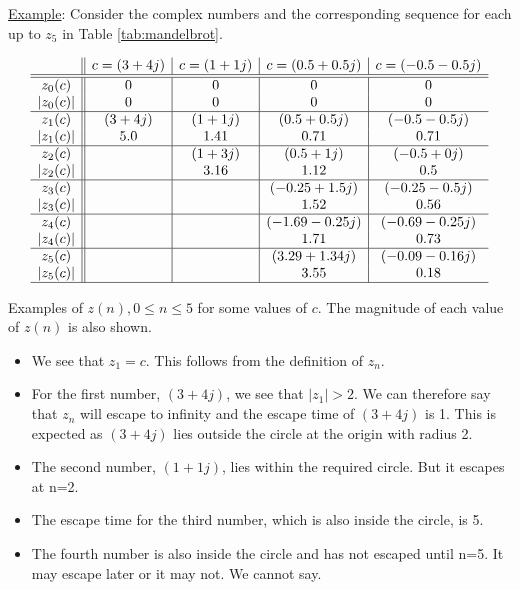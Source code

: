 \documentclass[addpoints]{exam}
\begin{document}
\begin{questions}
  \underline{Example}: Consider the complex numbers and the corresponding sequence for each up to $z_5$ in Table \ref{tab:mandelbrot}.
  \begin{table}
  \[
    \begin{array}{c|*{4}{|c}}
      & c=(3+4j) & c=(1+1j) & c=(0.5+0.5j) & c=(-0.5-0.5j)\\\hline\hline
      z_0(c) & 0 & 0 & 0 & 0\\
      |z_0(c)| & 0 & 0 & 0 & 0\\\hline
      z_1(c) & (3+4j) & (1+1j) & (0.5+0.5j) & (-0.5-0.5j)\\
      |z_1(c)| & 5.0 & 1.41 & 0.71 & 0.71\\\hline
      z_2(c) &  & (1+3j) & (0.5+1j) & (-0.5+0j)\\
      |z_2(c)| &  & 3.16 & 1.12 & 0.5\\\hline
      z_3(c) &  &  & (-0.25+1.5j) & (-0.25-0.5j)\\
      |z_3(c)| &  &  & 1.52 & 0.56\\\hline
      z_4(c) &  &  & (-1.69-0.25j) & (-0.69-0.25j)\\
      |z_4(c)| &  &  & 1.71 & 0.73\\\hline
      z_5(c) &  &  & (3.29+1.34j) & (-0.09-0.16j)\\
      |z_5(c)| &  &  & 3.55 & 0.18\\\hline
    \end{array}
  \]
  \caption{Examples of $z(n), 0\leq n\leq 5$ for some values of $c$. The magnitude of each value of $z(n)$ is also shown.}
  \label{tab:mandelbrot}
\end{table}
\begin{itemize}
  \item We see that $z_1=c$. This follows from the definition of $z_n$.
  \item For the first number, $(3+4j)$, we see that $|z_1|>2$. We can therefore say that $z_n$ will escape to infinity and the escape time of $(3+4j)$ is 1. This is expected as $(3+4j)$ lies outside the circle at the origin with radius 2.
  \item The second number, $(1+1j)$, lies within the required circle. But it escapes at n=2.
  \item The escape time for the third number, which is also inside the circle, is 5.
  \item The fourth number is also inside the circle and has not escaped until n=5. It may escape later or it may not. We cannot say.
  \end{itemize}
  

\end{questions}
\end{document}

